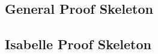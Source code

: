 \begin{figure}[H]
    \hfill
    \hfill
    \hfill
\end{figure}

\subsection{General Proof Skeleton}
\label{app:bb3}

\begin{multicols}{2}
    \end{multicols}


\subsection{Isabelle Proof Skeleton}
\label{app:bb4}

